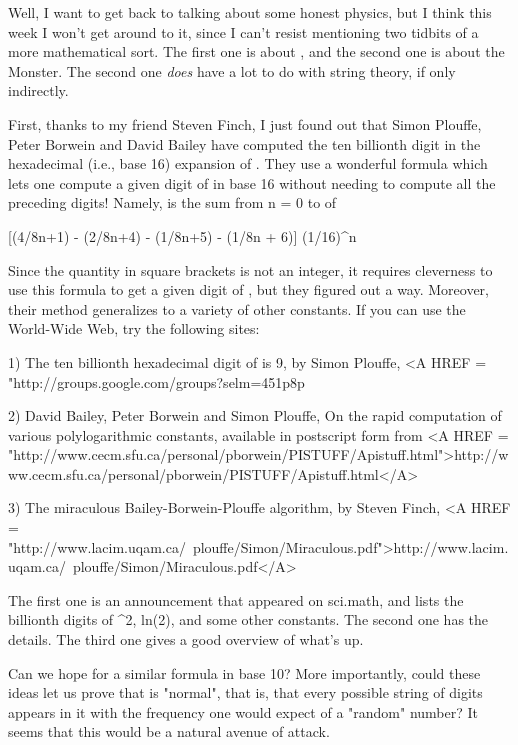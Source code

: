 

Well, I want to get back to talking about some honest physics, but I think 
this week I won't get around to it, since I can't resist mentioning
two tidbits of a more mathematical sort.  The first one is about \pi , and
the second one is about the Monster.  The second one \emph{does} have a lot
to do with string theory, if only indirectly. 

First, thanks to my friend Steven Finch, I just found out that Simon
Plouffe, Peter Borwein and David Bailey have computed the ten billionth
digit in the hexadecimal (i.e., base 16) expansion of \pi .  They use a
wonderful formula which lets one compute a given digit of \pi  in base 16
without needing to compute all the preceding digits!  Namely, \pi  is the
sum from n = 0 to \infty  of

[(4/8n+1) - (2/8n+4) - (1/8n+5) - (1/8n + 6)] (1/16)^{n}

Since the quantity in square brackets is not an integer, it requires
cleverness to use this formula to get a given digit of \pi , but they
figured out a way.  Moreover, their method generalizes to a variety
of other constants.  If you can use the World-Wide Web, try the
following sites:

1) The ten billionth hexadecimal digit of \pi  is 9, by Simon Plouffe,
<A HREF = "http://groups.google.com/groups?selm=451p8p%

2) David Bailey, Peter Borwein and Simon Plouffe, On the rapid
computation of various polylogarithmic constants, available in postscript 
form from <A HREF = "http://www.cecm.sfu.ca/personal/pborwein/PISTUFF/Apistuff.html">http://www.cecm.sfu.ca/personal/pborwein/PISTUFF/Apistuff.html</A>

3) The miraculous Bailey-Borwein-Plouffe \pi  algorithm, by Steven Finch,
<A HREF = "http://www.lacim.uqam.ca/~plouffe/Simon/Miraculous.pdf">http://www.lacim.uqam.ca/~plouffe/Simon/Miraculous.pdf</A>

The first one is an announcement that appeared on sci.math, and lists
the billionth digits of \pi ^{2}, ln(2), and some other
constants.  The second one has the details.  The third one gives a
good overview of what's up.

Can we hope for a similar formula in base 10?  More importantly, could
these ideas let us prove that \pi  is "normal", that is, that every
possible string of digits appears in it with the frequency one would
expect of a "random" number?  It seems that this would be a natural
avenue of attack.  


